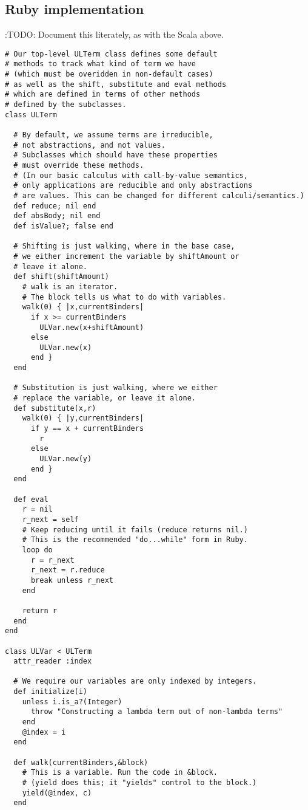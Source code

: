 \documentclass[11pt]{article}
\begin{document}
\subsection*{Ruby implementation}
\label{sec:org3b4725a}
:TODO: Document this literately, as with the Scala above.
\begin{verbatim}
# Our top-level ULTerm class defines some default
# methods to track what kind of term we have
# (which must be overidden in non-default cases)
# as well as the shift, substitute and eval methods
# which are defined in terms of other methods
# defined by the subclasses.
class ULTerm

  # By default, we assume terms are irreducible,
  # not abstractions, and not values.
  # Subclasses which should have these properties
  # must override these methods.
  # (In our basic calculus with call-by-value semantics,
  # only applications are reducible and only abstractions
  # are values. This can be changed for different calculi/semantics.)
  def reduce; nil end
  def absBody; nil end
  def isValue?; false end

  # Shifting is just walking, where in the base case,
  # we either increment the variable by shiftAmount or
  # leave it alone.
  def shift(shiftAmount)
    # walk is an iterator.
    # The block tells us what to do with variables.
    walk(0) { |x,currentBinders|
      if x >= currentBinders
        ULVar.new(x+shiftAmount)
      else
        ULVar.new(x)
      end }
  end

  # Substitution is just walking, where we either
  # replace the variable, or leave it alone.
  def substitute(x,r)
    walk(0) { |y,currentBinders|
      if y == x + currentBinders
        r
      else
        ULVar.new(y)
      end }
  end

  def eval
    r = nil
    r_next = self
    # Keep reducing until it fails (reduce returns nil.)
    # This is the recommended "do...while" form in Ruby.
    loop do
      r = r_next
      r_next = r.reduce
      break unless r_next
    end

    return r
  end
end

class ULVar < ULTerm
  attr_reader :index

  # We require our variables are only indexed by integers.
  def initialize(i)
    unless i.is_a?(Integer)
      throw "Constructing a lambda term out of non-lambda terms"
    end
    @index = i
  end
  
  def walk(currentBinders,&block)
    # This is a variable. Run the code in &block.
    # (yield does this; it "yields" control to the block.)
    yield(@index, c)
  end


\end{verbatim}
\end{document}
